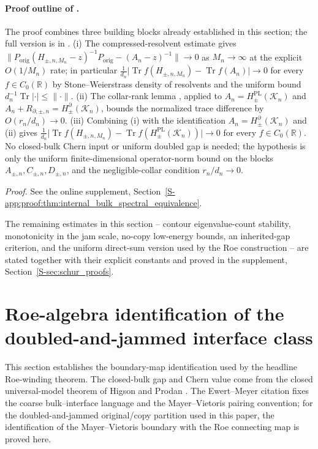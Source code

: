 \documentclass[11pt]{article}
\numberwithin{equation}{section}
\theoremstyle{definition}
\theoremstyle{remark}
\newcommand{\proofsuppref}[1]{%
  \par\noindent\emph{Proof.} See the online supplement, Section~\ref{S-#1}.\par\medskip
}
\newcommand{\K}{\mathcal{K}}
\newcommand{\bd}{\partial}
\begin{document}
\paragraph{Proof outline of .}
The proof combines three building blocks already established in this section; the full version
is in .
(i) The compressed-resolvent estimate  gives
\(\|P_{\mathrm{orig}}(H_{\pm,n,M_n}-z)^{-1}P_{\mathrm{orig}}-(A_n-z)^{-1}\|\to 0\) as
\(M_n\to\infty\) at the explicit \(O(1/M_n)\) rate; in particular
\(\tfrac{1}{d_n}\bigl|\operatorname{Tr} f(H_{\pm,n,M_n})-\operatorname{Tr} f(A_n)\bigr|\to 0\) for every
\(f\in C_0(\mathbb R)\) by Stone--Weierstrass density of resolvents and the uniform bound
\(d_n^{-1}\operatorname{Tr}|\cdot|\le \|\cdot\|\).
(ii) The collar-rank lemma , applied to
\(A_n=H^{\mathrm{PL}}_\pm(\K_n)\) and \(A_n+R_{\partial,\pm,n}=H^{\bd}_{\pm}(\K_n)\), bounds
the normalized trace difference by \(O(r_n/d_n)\to 0\).
(iii) Combining (i) with the identification \(A_n=H^{\bd}_\pm(\K_n)\) and (ii) gives
\(\tfrac{1}{d_n}\bigl|\operatorname{Tr} f(H_{\pm,n,M_n})-\operatorname{Tr} f(H^{\mathrm{PL}}_\pm(\K_n))\bigr|\to 0\) for
every \(f\in C_0(\mathbb R)\). No closed-bulk Chern input or uniform doubled gap is needed; the
hypothesis is only the uniform finite-dimensional operator-norm bound on the blocks
\(A_{\pm,n},C_{\pm,n},D_{\pm,n}\), and the negligible-collar condition \(r_n/d_n\to 0\).

\proofsuppref{app:proof:thm:internal_bulk_spectral_equivalence}

The remaining estimates in this section -- contour eigenvalue-count stability, monotonicity in the
jam scale, no-copy low-energy bounds, an inherited-gap criterion, and the uniform direct-sum
version used by the Roe construction -- are stated together with their explicit constants and
proved in the supplement, Section~\ref{S-sec:schur_proofs}.

\section{Roe-algebra identification of the doubled-and-jammed interface class}\label{sec:pathb_internalization}

This section establishes the boundary-map identification used by the headline Roe-winding theorem.
The closed-bulk gap and Chern value come from the closed universal-model theorem of Higson and
Prodan \cite{HigsonProdanUniversalPRL,HigsonProdanUniversalArxiv}. The Ewert--Meyer citation
\cite{EwertMeyer2019} fixes the coarse bulk--interface language and the Mayer--Vietoris pairing
convention; for the doubled-and-jammed original/copy partition used in this paper, the
identification of the Mayer--Vietoris boundary with the Roe connecting map is proved here.
\end{document}
